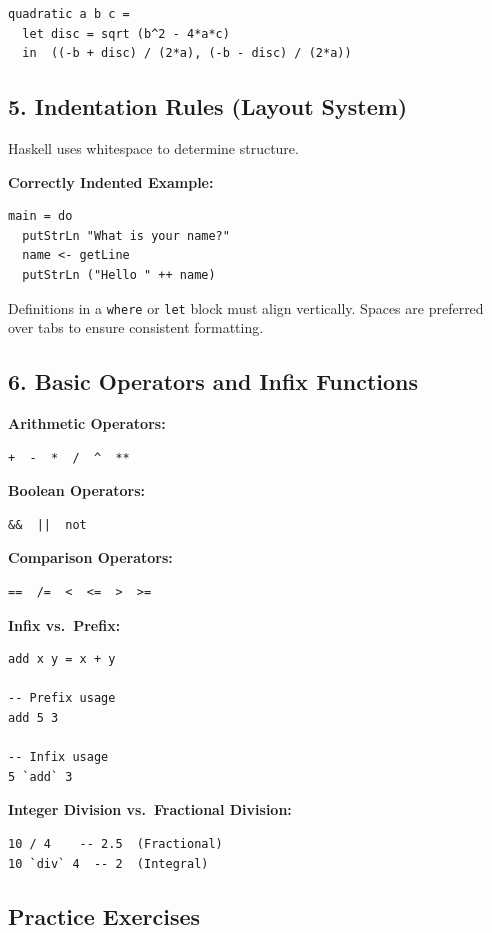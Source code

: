 \documentclass[12pt]{article}
\begin{document}
\begin{verbatim}
quadratic a b c =
  let disc = sqrt (b^2 - 4*a*c)
  in  ((-b + disc) / (2*a), (-b - disc) / (2*a))
\end{verbatim}

\subsection{5. Indentation Rules (Layout System)}

Haskell uses whitespace to determine structure.

\textbf{Correctly Indented Example:}
\begin{verbatim}
main = do
  putStrLn "What is your name?"
  name <- getLine
  putStrLn ("Hello " ++ name)
\end{verbatim}

Definitions in a \texttt{where} or \texttt{let} block must align vertically. Spaces are preferred over tabs to ensure consistent formatting.

\subsection{6. Basic Operators and Infix Functions}

\textbf{Arithmetic Operators:}
\begin{verbatim}
+  -  *  /  ^  **
\end{verbatim}

\textbf{Boolean Operators:}
\begin{verbatim}
&&  ||  not
\end{verbatim}

\textbf{Comparison Operators:}
\begin{verbatim}
==  /=  <  <=  >  >=
\end{verbatim}

\textbf{Infix vs.\ Prefix:}

\begin{verbatim}
add x y = x + y

-- Prefix usage
add 5 3

-- Infix usage
5 `add` 3
\end{verbatim}

\textbf{Integer Division vs.\ Fractional Division:}

\begin{verbatim}
10 / 4    -- 2.5  (Fractional)
10 `div` 4  -- 2  (Integral)
\end{verbatim}

\subsection{Practice Exercises}
\end{document}
